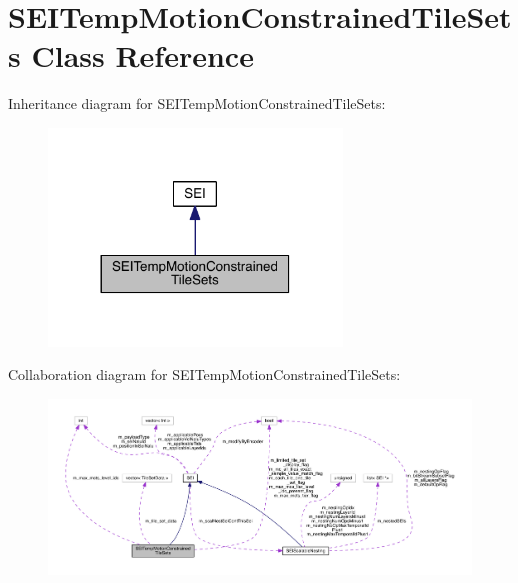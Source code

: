 \hypertarget{class_s_e_i_temp_motion_constrained_tile_sets}{}\section{S\+E\+I\+Temp\+Motion\+Constrained\+Tile\+Sets Class Reference}
\label{class_s_e_i_temp_motion_constrained_tile_sets}


Inheritance diagram for S\+E\+I\+Temp\+Motion\+Constrained\+Tile\+Sets\+:
\nopagebreak
\begin{figure}[H]
\begin{center}
\leavevmode
\includegraphics[width=221pt]{d7/dde/class_s_e_i_temp_motion_constrained_tile_sets__inherit__graph}
\end{center}
\end{figure}


Collaboration diagram for S\+E\+I\+Temp\+Motion\+Constrained\+Tile\+Sets\+:
\nopagebreak
\begin{figure}[H]
\begin{center}
\leavevmode
\includegraphics[width=350pt]{d9/d8d/class_s_e_i_temp_motion_constrained_tile_sets__coll__graph}
\end{center}
\end{figure}
